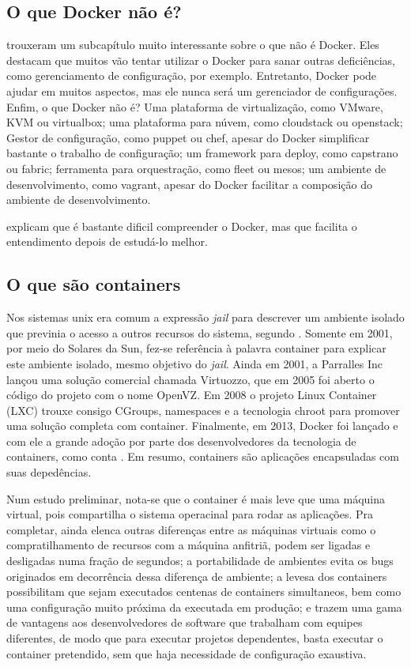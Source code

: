 \documentclass[
	12pt,				%
	openright,			%
	oneside,			%
	a4paper,			%
	chapter=TITLE,		%
	section=TITLE,		%
	english,			%
	french,				%
	spanish,			%
	brazil				%
	]{abntex2}
\begin{document}
\subsection{O que Docker não é?}

 trouxeram um subcapítulo muito interessante sobre o que não é Docker. Eles destacam que muitos vão tentar utilizar o Docker para sanar outras deficiências, como gerenciamento de configuração, por exemplo. Entretanto, Docker pode ajudar em muitos aspectos, mas ele nunca será um gerenciador de configurações. Enfim, o que Docker não é? Uma plataforma de virtualização, como VMware, KVM ou virtualbox; uma plataforma para núvem, como cloudstack ou openstack; Gestor de configuração, como puppet ou chef, apesar do Docker simplificar bastante o trabalho de configuração; um framework para deploy, como capstrano ou fabric; ferramenta para orquestração, como fleet ou mesos; um ambiente de desenvolvimento, como vagrant, apesar do Docker facilitar a composição do ambiente de desenvolvimento.

 explicam que é bastante dificil compreender o Docker, mas que facilita o entendimento depois de estudá-lo melhor.

\subsection{O que são containers}

Nos sistemas unix era comum a expressão \textit{jail} para descrever um ambiente isolado que previnia o acesso a outros recursos do sistema, segundo . Somente em 2001, por meio do Solares da Sun, fez-se referência à palavra container para explicar este ambiente isolado, mesmo objetivo do \textit{jail}. Ainda em 2001, a Parralles Inc lançou uma solução comercial chamada Virtuozzo, que em 2005 foi aberto o código do projeto com o nome OpenVZ. Em 2008 o projeto Linux Container (LXC) trouxe consigo CGroups, namespaces e a tecnologia chroot para promover uma solução completa com container. Finalmente, em 2013, Docker foi lançado e com ele a grande adoção por parte dos desenvolvedores da tecnologia de containers, como conta . Em resumo, containers são aplicações encapsuladas com suas depedências.

Num estudo preliminar, nota-se que o container é mais leve que uma máquina virtual, pois compartilha o sistema operacinal para rodar as aplicações. Pra completar, ainda elenca outras diferenças entre as máquinas virtuais como o compratilhamento de recursos com a máquina anfitriã, podem ser ligadas e desligadas numa fração de segundos; a portabilidade de ambientes evita os bugs originados em decorrência dessa diferença de ambiente; a levesa dos containers possibilitam que sejam executados centenas de containers simultaneos, bem como uma configuração muito próxima da executada em produção; e trazem uma gama de vantagens aos desenvolvedores de software que trabalham com equipes diferentes, de modo que para executar projetos dependentes, basta executar o container pretendido, sem que haja necessidade de configuração exaustiva.
\end{document}
